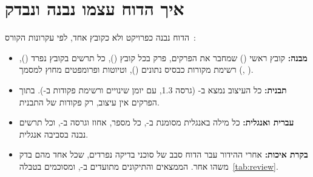 \section{איך הדוח עצמו נבנה ונבדק}\label{sec:qa}
הדוח נבנה כפרויקט ולא כקובץ אחד, לפי עקרונות הקורס~\cite{segal2026l03}:
\begin{itemize}
\item \textbf{מבנה:} קובץ ראשי () שמחבר את הפרקים, פרק בכל קובץ (), כל תרשים בקובץ נפרד (), רשימת מקורות כבסיס נתונים (), וטיוטות ופרומפטים מחוץ למסמך (, ).
\item \textbf{תבנית:} כל העיצוב נמצא ב- (גרסה \num{1.3}, עם יומן שינויים ורשימת פקודות ב-). בתוך הפרקים אין עיצוב, רק פקודות של התבנית.
\item \textbf{עברית ואנגלית:} כל מילה באנגלית מסומנת ב-, כל מספר, אחוז וגרסה ב-, וכל תרשים נבנה בסביבה אנגלית.
\item \textbf{בקרת איכות:} אחרי ההידור עבר הדוח סבב של סוכני בדיקה נפרדים, שכל אחד מהם בדק משהו אחר. הממצאים והתיקונים מתועדים ב-, ומסוכמים בטבלה~\ref{tab:review}.
\end{itemize}


